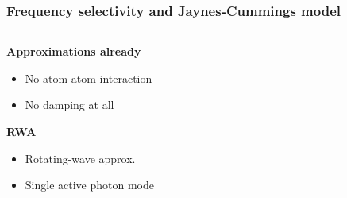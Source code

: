 \documentclass[t]{beamer}
\begin{document}
\begin{frame}
\frametitle{Frequency selectivity and Jaynes-Cummings model}

\begin{columns}
    \begin{column}{0.5\textwidth}
        \textbf{Approximations already}
        \begin{itemize}
        \item No atom-atom interaction
        \item No damping at all
        \end{itemize}
        \textbf{RWA}
        \begin{itemize}
        \item Rotating-wave approx. 
        \item Single active photon mode
        \end{itemize}
    \end{column}
    \begin{column}{0.5\textwidth}
        \begin{center}

            \begin{tikzpicture}[x=0.75pt,y=0.75pt,yscale=-0.7,xscale=0.7]
            

\end{tikzpicture}
\end{center}
\end{column}
\end{columns}
\end{frame}
\end{document}
